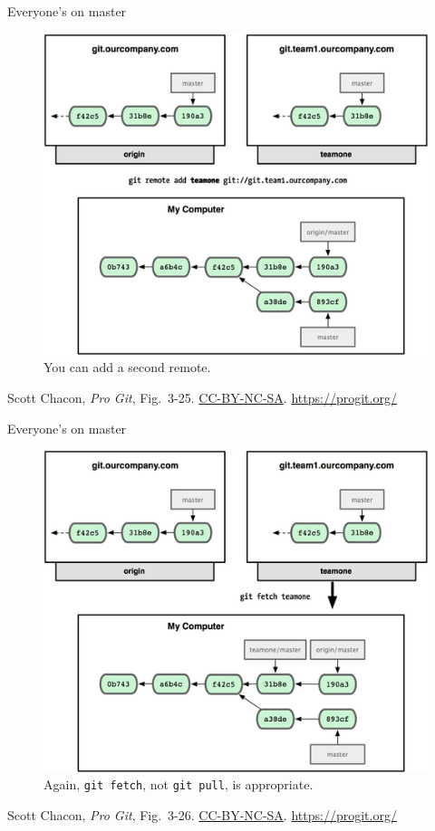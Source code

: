 \begin{frame}{Everyone's on master}
  \begin{figure}
    \includegraphics[scale=0.8]{18333fig0325-tn.png}
    \\ You can add a second remote.
  \end{figure}
  \footnotesize{Scott Chacon,
    \emph{Pro Git},
    Fig.~3-25.
    \href{https://creativecommons.org/licenses/by-nc-sa/3.0/legalcode}{CC-BY-NC-SA}.
    \href{https://progit.org/}{https://progit.org/}}
\end{frame}

\begin{frame}{Everyone's on master}
  \begin{figure}
    \includegraphics[scale=0.8]{18333fig0326-tn.png}
    \\ Again, \texttt{git fetch}, not \texttt{git pull}, is appropriate.
  \end{figure}
  \footnotesize{Scott Chacon,
    \emph{Pro Git},
    Fig.~3-26.
    \href{https://creativecommons.org/licenses/by-nc-sa/3.0/legalcode}{CC-BY-NC-SA}.
    \href{https://progit.org/}{https://progit.org/}}
\end{frame}

